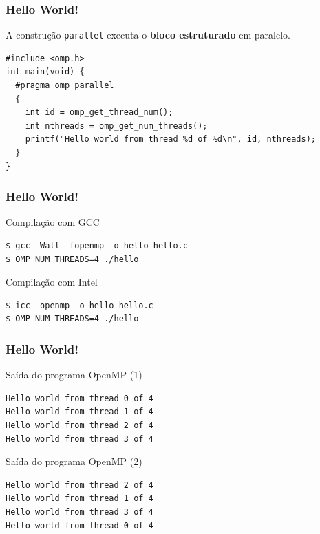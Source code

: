 \documentclass[xcolor={usenames,dvipsnames},12pt,presentation,aspectratio=169]{beamer}
\begin{document}
\begin{frame}[fragile]
  \frametitle{Hello World!}
  A construção \texttt{parallel} executa o {\bf bloco estruturado} em paralelo.
\begin{minipage}{0.95\textwidth}  
\begin{verbatim}
#include <omp.h>
int main(void) {
  #pragma omp parallel
  {
    int id = omp_get_thread_num();
    int nthreads = omp_get_num_threads();
    printf("Hello world from thread %d of %d\n", id, nthreads);
  }
}
\end{verbatim}
\end{minipage}
\end{frame}
\begin{frame}[fragile]
  \frametitle{Hello World!}
  \begin{block}{Compilação com GCC}
\begin{verbatim}
$ gcc -Wall -fopenmp -o hello hello.c
$ OMP_NUM_THREADS=4 ./hello
\end{verbatim}
  \end{block}
  \begin{block}{Compilação com Intel}
\begin{verbatim}
$ icc -openmp -o hello hello.c
$ OMP_NUM_THREADS=4 ./hello
\end{verbatim}
  \end{block}
\end{frame}
\begin{frame}[fragile]
  \frametitle{Hello World!}
  \begin{block}{Saída do programa OpenMP (1)}
\begin{verbatim}
Hello world from thread 0 of 4
Hello world from thread 1 of 4
Hello world from thread 2 of 4
Hello world from thread 3 of 4
\end{verbatim}
  \end{block}
  \begin{block}{Saída do programa OpenMP (2)}
\begin{verbatim}
Hello world from thread 2 of 4
Hello world from thread 1 of 4
Hello world from thread 3 of 4
Hello world from thread 0 of 4
\end{verbatim}
  \end{block}
\end{frame}
\end{document}
